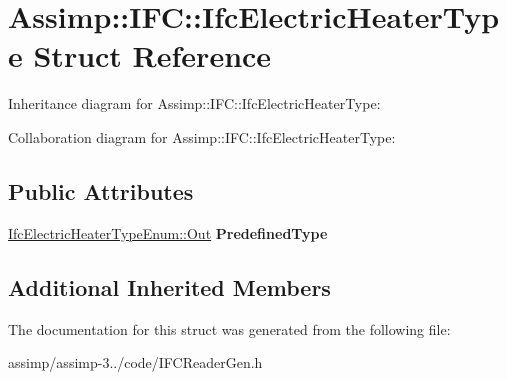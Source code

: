 \hypertarget{struct_assimp_1_1_i_f_c_1_1_ifc_electric_heater_type}{\section{Assimp\+:\+:I\+F\+C\+:\+:Ifc\+Electric\+Heater\+Type Struct Reference}
\label{struct_assimp_1_1_i_f_c_1_1_ifc_electric_heater_type}
}


Inheritance diagram for Assimp\+:\+:I\+F\+C\+:\+:Ifc\+Electric\+Heater\+Type\+:


Collaboration diagram for Assimp\+:\+:I\+F\+C\+:\+:Ifc\+Electric\+Heater\+Type\+:
\subsection*{Public Attributes}
\begin{DoxyCompactItemize}
\item 
\hypertarget{struct_assimp_1_1_i_f_c_1_1_ifc_electric_heater_type_adc5a5d221aa111279c606107ad7234a3}{\hyperlink{classboost_1_1shared__ptr}{Ifc\+Electric\+Heater\+Type\+Enum\+::\+Out} {\bfseries Predefined\+Type}}\label{struct_assimp_1_1_i_f_c_1_1_ifc_electric_heater_type_adc5a5d221aa111279c606107ad7234a3}

\end{DoxyCompactItemize}
\subsection*{Additional Inherited Members}


The documentation for this struct was generated from the following file\+:\begin{DoxyCompactItemize}
\item 
assimp/assimp-\/3../code/I\+F\+C\+Reader\+Gen.\+h\end{DoxyCompactItemize}
